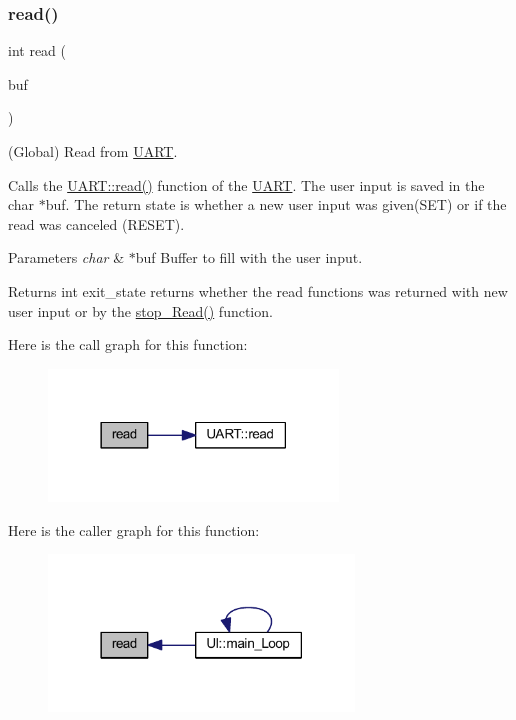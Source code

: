 \subsubsection{\texorpdfstring{read()}{read()}}
{\footnotesize\ttfamily int read (\begin{DoxyParamCaption}\item[{char $\ast$}]{buf }\end{DoxyParamCaption})}



(Global) Read from \mbox{\hyperlink{namespace_u_a_r_t}{U\+A\+RT}}. 

Calls the \mbox{\hyperlink{namespace_u_a_r_t_a1087fba97ca797e5ca155228ff9eec55}{U\+A\+R\+T\+::read()}} function of the \mbox{\hyperlink{namespace_u_a_r_t}{U\+A\+RT}}. The user input is saved in the char $\ast$buf. The return state is whether a new user input was given(\+S\+E\+T) or if the read was canceled (R\+E\+S\+ET).


\begin{DoxyParams}{Parameters}
{\em char} & $\ast$buf Buffer to fill with the user input. \\
\hline
\end{DoxyParams}
\begin{DoxyReturn}{Returns}
int exit\+\_\+state returns whether the read functions was returned with new user input or by the \mbox{\hyperlink{namespace_i_o_a04c5db8c053f07761c5c09894a4bd49d}{stop\+\_\+\+Read()}} function. 
\end{DoxyReturn}
Here is the call graph for this function\+:\nopagebreak
\begin{figure}[H]
\begin{center}
\leavevmode
\includegraphics[width=218pt]{namespace_i_o_a1087fba97ca797e5ca155228ff9eec55_cgraph}
\end{center}
\end{figure}
Here is the caller graph for this function\+:\nopagebreak
\begin{figure}[H]
\begin{center}
\leavevmode
\includegraphics[width=230pt]{namespace_i_o_a1087fba97ca797e5ca155228ff9eec55_icgraph}
\end{center}
\end{figure}
\mbox{\label{namespace_i_o_a04c5db8c053f07761c5c09894a4bd49d}} 
